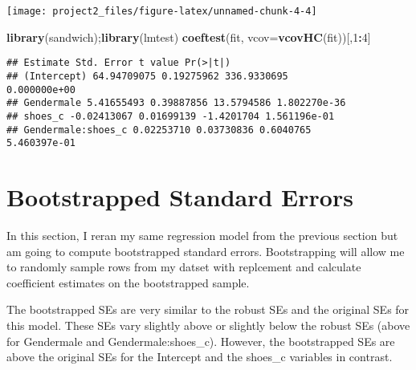 \documentclass[]{article}
\newenvironment{Shaded}{\begin{snugshade}}{\end{snugshade}}
\newcommand{\CommentTok}[1]{\textcolor[rgb]{0.56,0.35,0.01}{\textit{#1}}}
\newcommand{\DataTypeTok}[1]{\textcolor[rgb]{0.13,0.29,0.53}{#1}}
\newcommand{\DecValTok}[1]{\textcolor[rgb]{0.00,0.00,0.81}{#1}}
\newcommand{\KeywordTok}[1]{\textcolor[rgb]{0.13,0.29,0.53}{\textbf{#1}}}
\newcommand{\NormalTok}[1]{#1}
\newcommand{\OperatorTok}[1]{\textcolor[rgb]{0.81,0.36,0.00}{\textbf{#1}}}
\newcommand{\OtherTok}[1]{\textcolor[rgb]{0.56,0.35,0.01}{#1}}
\newcommand{\StringTok}[1]{\textcolor[rgb]{0.31,0.60,0.02}{#1}}
\begin{document}
\begin{center}\texttt{[image: project2\_files/figure-latex/unnamed-chunk-4-4]} \end{center}

\begin{Shaded}
\begin{Highlighting}[]
\KeywordTok{library}\NormalTok{(sandwich);}\KeywordTok{library}\NormalTok{(lmtest)}
\KeywordTok{coeftest}\NormalTok{(fit, }\DataTypeTok{vcov=}\KeywordTok{vcovHC}\NormalTok{(fit))[,}\DecValTok{1}\OperatorTok{:}\DecValTok{4}\NormalTok{]}
\end{Highlighting}
\end{Shaded}

\begin{verbatim}
## Estimate Std. Error t value Pr(>|t|)
## (Intercept) 64.94709075 0.19275962 336.9330695
0.000000e+00
## Gendermale 5.41655493 0.39887856 13.5794586 1.802270e-36
## shoes_c -0.02413067 0.01699139 -1.4201704 1.561196e-01
## Gendermale:shoes_c 0.02253710 0.03730836 0.6040765
5.460397e-01
\end{verbatim}

\hypertarget{bootstrapped-standard-errors}{%
\section{Bootstrapped Standard
Errors}\label{bootstrapped-standard-errors}}

In this section, I reran my same regression model from the previous
section but am going to compute bootstrapped standard errors.
Bootstrapping will allow me to randomly sample rows from my datset with
replcement and calculate coefficient estimates on the bootstrapped
sample.

The bootstrapped SEs are very similar to the robust SEs and the original
SEs for this model. These SEs vary slightly above or slightly below the
robust SEs (above for Gendermale and Gendermale:shoes\_c). However, the
bootstrapped SEs are above the original SEs for the Intercept and the
shoes\_c variables in contrast.

\begin{Shaded}
\end{Shaded}
\end{document}
